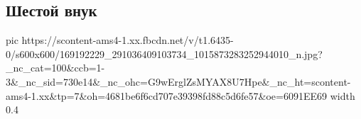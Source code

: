  
 
 
 
 

\subsection{Шестой внук}

\ifcmt
  pic https://scontent-ams4-1.xx.fbcdn.net/v/t1.6435-0/s600x600/169192229_291036409103734_1015873283252944010_n.jpg?_nc_cat=100&ccb=1-3&_nc_sid=730e14&_nc_ohc=G9wErglZsMYAX8U7Hpe&_nc_ht=scontent-ams4-1.xx&tp=7&oh=4681be6f6cd707e39398fd88c5d6fe57&oe=6091EE69
  width 0.4
\fi

